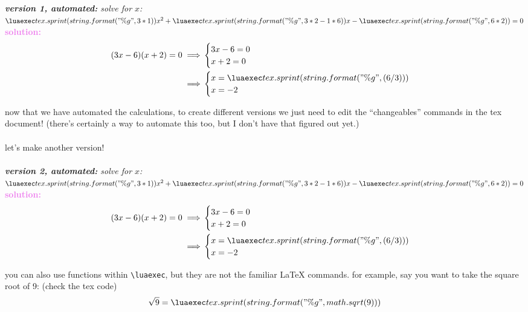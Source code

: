 \documentclass{article}
\newcommand\mycalc[1]{%
    \luaexec{ tex.sprint ( string.format( "\%g" , #1 ) )}
}%
\begin{document}
\emph{\textbf{version 1, automated:} solve for $x$:} $\coeffone x^2 + \coefftwo x - \coeffthree = 0 $ \\
    \textcolor{violet}{
    \textbf{solution:}
    \begin{align*}
        (\aval x-\bval)(x+\cval) = 0 
        \implies & \begin{cases}
            \aval x - \bval = 0 \\
            x+\cval = 0 
        \end{cases} \\
        \implies & \begin{cases}
            x = \xone \\
            x = -\cval
        \end{cases}
    \end{align*}}

now that we have automated the calculations, to create different versions we just need to edit the ``changeables'' commands in the tex document! (there's certainly a way to automate this too, but I don't have that figured out yet.)\\\\ let's make another version!\\\\ 
\renewcommand{\aval}{3}
\renewcommand{\bval}{6}
\renewcommand{\cval}{2}
\emph{\textbf{version 2, automated:} solve for $x$:} $\coeffone x^2 + \coefftwo x - \coeffthree = 0 $ \\
    \textcolor{violet}{
    \textbf{solution:}\\
    \begin{align*}
        (\aval x-\bval)(x+\cval) = 0 
        \implies & \begin{cases}
            \aval x - \bval = 0 \\
            x+\cval = 0 
        \end{cases} \\
        \implies & \begin{cases}
            x = \xone \\
            x = -\cval
        \end{cases}
    \end{align*}}

you can also use functions within \texttt{\textbackslash luaexec}, but they are not the familiar LaTeX commands. for example, say you want to take the square root of 9: (check the tex code)
\[ \sqrt{9} = \mycalc{math.sqrt(9)}\]
\end{document}
